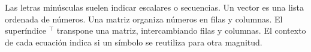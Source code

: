 \medskip
\noindent{}
{Las letras minúsculas suelen indicar escalares o secuencias. Un vector es una lista ordenada de números. Una matriz organiza números en filas y columnas. El superíndice \({}^\top\) transpone una matriz, intercambiando filas y columnas. El contexto de cada ecuación indica si un símbolo se reutiliza para otra magnitud.}
